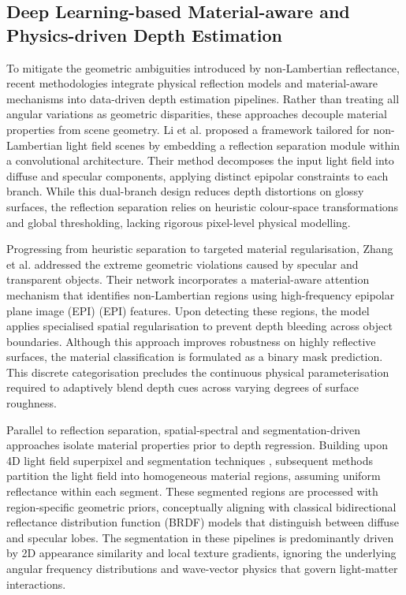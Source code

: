\documentclass[lettersize,journal]{IEEEtran}
\begin{document}
\subsection{Deep Learning-based Material-aware and Physics-driven Depth Estimation}

To mitigate the geometric ambiguities introduced by non-Lambertian reflectance, recent methodologies integrate physical reflection models and material-aware mechanisms into data-driven depth estimation pipelines. Rather than treating all angular variations as geometric disparities, these approaches decouple material properties from scene geometry. Li et al. \cite{li2021} proposed a framework tailored for non-Lambertian light field scenes by embedding a reflection separation module within a convolutional architecture. Their method decomposes the input light field into diffuse and specular components, applying distinct epipolar constraints to each branch. While this dual-branch design reduces depth distortions on glossy surfaces, the reflection separation relies on heuristic colour-space transformations and global thresholding, lacking rigorous pixel-level physical modelling.

Progressing from heuristic separation to targeted material regularisation, Zhang et al. \cite{zhang2023} addressed the extreme geometric violations caused by specular and transparent objects. Their network incorporates a material-aware attention mechanism that identifies non-Lambertian regions using high-frequency epipolar plane image (EPI) (EPI) features. Upon detecting these regions, the model applies specialised spatial regularisation to prevent depth bleeding across object boundaries. Although this approach improves robustness on highly reflective surfaces, the material classification is formulated as a binary mask prediction. This discrete categorisation precludes the continuous physical parameterisation required to adaptively blend depth cues across varying degrees of surface roughness.

Parallel to reflection separation, spatial-spectral and segmentation-driven approaches isolate material properties prior to depth regression. Building upon 4D light field superpixel and segmentation techniques \cite{hog2017}, subsequent methods partition the light field into homogeneous material regions, assuming uniform reflectance within each segment. These segmented regions are processed with region-specific geometric priors, conceptually aligning with classical bidirectional reflectance distribution function (BRDF) models \cite{blinn1977} that distinguish between diffuse and specular lobes. The segmentation in these pipelines is predominantly driven by 2D appearance similarity and local texture gradients, ignoring the underlying angular frequency distributions and wave-vector physics that govern light-matter interactions.
\end{document}
